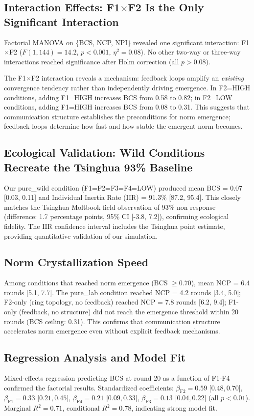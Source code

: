 \subsection{Interaction Effects: F1$\times$F2 Is the Only Significant Interaction}
\label{sec:interactions}

Factorial MANOVA on \{BCS, NCP, NPI\} revealed one significant interaction: F1$\times$F2 ($F(1, 144) = 14.2$, $p < 0.001$, $\eta^2 = 0.08$). No other two-way or three-way interactions reached significance after Holm correction (all $p > 0.08$).

The F1$\times$F2 interaction reveals a mechanism: feedback loops amplify an \emph{existing} convergence tendency rather than independently driving emergence. In F2=HIGH conditions, adding F1=HIGH increases BCS from 0.58 to 0.82; in F2=LOW conditions, adding F1=HIGH increases BCS from 0.08 to 0.31. This suggests that communication structure establishes the preconditions for norm emergence; feedback loops determine how fast and how stable the emergent norm becomes.

\subsection{Ecological Validation: Wild Conditions Recreate the Tsinghua 93\% Baseline}
\label{sec:wild-validation}

Our pure\_wild condition (F1=F2=F3=F4=LOW) produced mean BCS = 0.07 [0.03, 0.11] and Individual Inertia Rate (IIR) = 91.3\% [87.2, 95.4]. This closely matches the Tsinghua Moltbook field observation of 93\% non-response \citep{li2026tsinghua} (difference: 1.7 percentage points, 95\% CI [-3.8, 7.2]), confirming ecological fidelity. The IIR confidence interval includes the Tsinghua point estimate, providing quantitative validation of our simulation.

\subsection{Norm Crystallization Speed}
\label{sec:ncp}

Among conditions that reached norm emergence (BCS $\geq 0.70$), mean NCP = 6.4 rounds [5.1, 7.7]. The pure\_lab condition reached NCP = 4.2 rounds [3.4, 5.0]; F2-only (ring topology, no feedback) reached NCP = 7.8 rounds [6.2, 9.4]; F1-only (feedback, no structure) did not reach the emergence threshold within 20 rounds (BCS ceiling: 0.31). This confirms that communication structure accelerates norm emergence even without explicit feedback mechanisms.

\subsection{Regression Analysis and Model Fit}
\label{sec:regression}

Mixed-effects regression predicting BCS at round 20 as a function of F1-F4 confirmed the factorial results. Standardized coefficients: $\beta_{\text{F2}} = 0.59$ [$0.48, 0.70$], $\beta_{\text{F1}} = 0.33$ [$0.21, 0.45$], $\beta_{\text{F4}} = 0.21$ [$0.09, 0.33$], $\beta_{\text{F3}} = 0.13$ [$0.04, 0.22$] (all $p < 0.01$). Marginal $R^2 = 0.71$, conditional $R^2 = 0.78$, indicating strong model fit.
